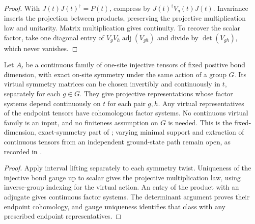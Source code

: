 \begin{proof}\leanok
    With $J(t)J(t)^\dagger=P(t)$, compress by
    $J(t)^\dagger V_g(t)J(t)$. Invariance inserts the projection between
    products, preserving the projective multiplication law and unitarity.
    Matrix multiplication gives continuity. To recover the scalar factor,
    take one diagonal entry of
    $V_gV_h\operatorname{adj}(V_{gh})$ and divide by
    $\det(V_{gh})$, which never vanishes.
\end{proof}

\begin{lemma}
    \label{thm:spt_tensor_path_class_invariance}
    \leanok

    Let $A_t$ be a continuous family of one-site injective tensors
    of fixed positive bond dimension, with exact on-site symmetry
    under the same action of a group $G$.
    Its virtual symmetry matrices can be chosen invertibly and
    continuously in $t$, separately for each $g\in G$.
    They give projective representations whose factor systems depend
    continuously on $t$ for each pair $g,h$.
    Any virtual representatives of the endpoint tensors have
    cohomologous factor systems. No continuous virtual family is an
    input, and no finiteness assumption on $G$ is needed.
    This is the fixed-dimension, exact-symmetry part of
    \cite[Section~II.F.2]{Schuch2011Phases}; varying minimal support and
    extraction of continuous tensors from an independent ground-state
    path remain open, as recorded in
    \cite{gap:spc11_spt_interpolation_upper_range}.
\end{lemma}

\begin{proof}\leanok
    Apply interval lifting separately to each symmetry twist.
    Uniqueness of the injective bond gauge up to scalar gives the
    projective multiplication law, using inverse-group indexing for
    the virtual action. An entry of the product with an adjugate
    gives continuous factor systems. The determinant argument proves
    their endpoint cohomology, and gauge uniqueness identifies that
    class with any prescribed endpoint representatives.
\end{proof}

